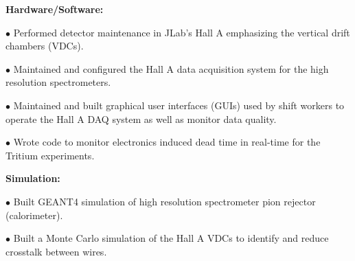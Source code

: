 \documentclass[letterpaper,10pt]{article}
\renewenvironment{itemize}{
  \begin{list}{}{
    \setlength{\leftmargin}{1.5em}
  }
}{
  \end{list}
}
\begin{document}
{\begin{itemize}
\begin{itemize}
  \item \textbf{Hardware/Software:}
    \begin{itemize}\itemsep5pt \parskip0pt 
     \item $\bullet$ Performed detector maintenance in JLab's Hall A emphasizing the vertical drift chambers (VDCs). 
     \item $\bullet$ Maintained and configured the Hall A data acquisition system for the high resolution spectrometers.
     \item $\bullet$ Maintained and built graphical user interfaces (GUIs) used by shift workers to operate the Hall A DAQ system as well as monitor data quality.
     \item $\bullet$ Wrote code to monitor electronics induced dead time in real-time for the Tritium experiments.
    \end{itemize}
    
   \item \textbf{Simulation:}
     \begin{itemize}\itemsep5pt \parskip0pt 
      \item $\bullet$ Built GEANT4 simulation of high resolution spectrometer pion rejector (calorimeter).
      \item $\bullet$ Built a Monte Carlo simulation of the Hall A VDCs to identify and reduce crosstalk between wires. 
     \end{itemize} 
     

\end{itemize}
\end{itemize}}
\end{document}
